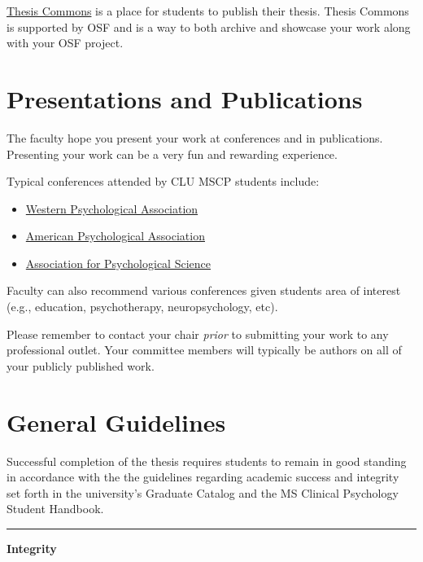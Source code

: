 \documentclass[
  openany]{book}
\providecommand{\tightlist}{%
  \setlength{\itemsep}{0pt}\setlength{\parskip}{0pt}}
\begin{document}
\href{https://thesiscommons.org/}{Thesis Commons} is a place for students to publish their thesis. Thesis Commons is supported by OSF and is a way to both archive and showcase your work along with your OSF project.

\hypertarget{presentations-and-publications}{%
\chapter{Presentations and Publications}\label{presentations-and-publications}}

The faculty hope you present your work at conferences and in publications. Presenting your work can be a very fun and rewarding experience.

Typical conferences attended by CLU MSCP students include:

\begin{itemize}
\tightlist
\item
  \href{https://westernpsych.org/convention/}{Western Psychological Association}
\item
  \href{https://convention.apa.org/}{American Psychological Association}
\item
  \href{https://www.psychologicalscience.org/conventions/annual}{Association for Psychological Science}
\end{itemize}

Faculty can also recommend various conferences given students area of interest (e.g., education, psychotherapy, neuropsychology, etc).

Please remember to contact your chair \emph{prior} to submitting your work to any professional outlet. Your committee members will typically be authors on all of your publicly published work.

\hypertarget{general-guidelines}{%
\chapter{General Guidelines}\label{general-guidelines}}

Successful completion of the thesis requires students to remain in good standing in accordance with the the guidelines regarding academic success and integrity set forth in the university's Graduate Catalog and the MS Clinical Psychology Student Handbook.

\begin{center}\rule{0.5\linewidth}{0.5pt}\end{center}

\textbf{Integrity}
\end{document}
